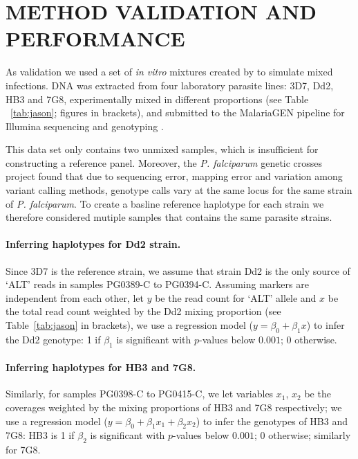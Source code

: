 \documentclass{nature}
\begin{document}
\section*{METHOD VALIDATION AND PERFORMANCE}

As validation we used a set of {\it in vitro} mixtures created by \cite{Wendler2015} to simulate mixed infections. DNA was extracted from four laboratory parasite lines: 3D7, Dd2, HB3 and 7G8, experimentally mixed in different proportions (see Table ~\ref{tab:jason}; figures in brackets), and submitted to the MalariaGEN pipeline \cite{MalariaGen2008} for Illumina sequencing and genotyping \cite{Menske2012}.

This data set only contains two unmixed samples, which is insufficient for constructing a reference panel. Moreover, the {\em P. falciparum} genetic crosses project \cite{Miles2016} found that due to sequencing error, mapping error and variation among variant calling methods, genotype calls vary at the same locus for the same strain of {\it P. falciparum}. To create a basline reference haplotype for each strain we therefore considered mutiple samples that contains the same parasite strains.

\paragraph{Inferring haplotypes for Dd2 strain.}
Since 3D7 is the reference strain, we assume that strain Dd2 is the only source of `ALT' reads in samples {\textmd PG0389-C} to {\textmd PG0394-C}. Assuming markers are independent from each other, let $y$ be the read count for `ALT' allele and $x$ be the total read count weighted by the Dd2 mixing proportion (see Table~\ref{tab:jason} in brackets), we use a regression model ($y = \beta_0 + \beta_{1} x$) to infer the Dd2 genotype: 1 if $\beta_{1}$ is significant with $p$-values below $0.001$; 0 otherwise.

\paragraph{Inferring haplotypes for HB3 and 7G8.}
Similarly, for samples {\textmd PG0398-C} to {\textmd PG0415-C}, we let variables $x_1$, $x_2$ be the coverages weighted by the mixing proportions of HB3 and 7G8 respectively; we use a regression model ($y = \beta_0 + \beta_{1} x_1 + \beta_{2} x_2$) to infer the genotypes of HB3 and 7G8: HB3 is 1 if $\beta_{2}$ is significant with $p$-values below $0.001$; 0 otherwise; similarly for 7G8.
\end{document}
